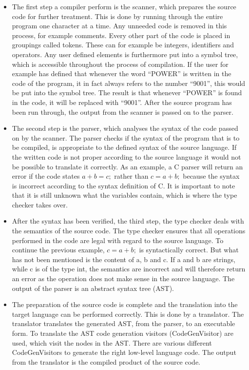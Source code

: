 \begin{itemize}
	\item The first step a compiler perform is the scanner, which prepares the source code for further treatment. This is done by running through the entire program one character at a time. Any unneeded code is removed in this process, for example comments.  Every other part of the code is placed in groupings called tokens. These can for example be integers, identifiers and operators. Any user defined elements is furthermore put into a symbol tree, which is accessible throughout the process of compilation. If the user for example has defined that whenever the word ``POWER'' is written in the code of the program, it in fact always refers to the number ``9001'', this would be put into the symbol tree. The result is that whenever ``POWER'' is found in the code, it will be replaced with ``9001''. After the source program has been run through, the output from the scanner is passed on to the parser.
	
	\item The second step is the parser, which analyses the syntax of the code passed on by the scanner. The parser checks if the syntax of the program that is to be compiled, is appropriate to the defined syntax of the source language. If the written code is not proper according to the source language it would not be possible to translate it correctly. As an example, a C parser will return an error if the code states $a + b = c;$ rather than $c = a + b;$ because the syntax is incorrect according to the syntax definition of C. It is important to note that it is still unknown what the variables contain, which is where the type checker takes over.

	\item After the syntax has been verified, the third step, the type checker deals with the semantics of the source code. The type checker ensures that all operations performed in the code are legal with regard to the source language. To continue the previous example, $c = a + b;$ is syntactically correct. But what has not been mentioned is the content of a, b and c. If a and b are strings, while c is of the type int, the semantics are incorrect and will therefore return an error as the operation does not make sense in the source language. The output of the parser is an abstract syntax tree (AST). 

	\item The preparation of the source code is complete and the translation into the target language can be performed correctly. This is done by a translator. The translator translates the generated AST, from the parser, to an executable form. To translate the AST code generation visitors (CodeGenVisitor) are used, which visit the nodes in the AST. There are various different CodeGenVisitors to generate the right low-level language code. The output from the translator is the compiled product of the source code.
\end{itemize}

